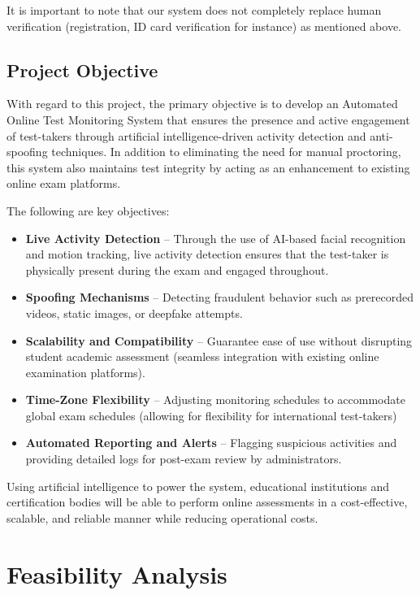 \documentclass[12pt,a4paper]{article}
\begin{document}
It is important to note that our system does not completely replace human verification (registration, ID card verification for instance) as mentioned above.

\subsection{Project Objective}

With regard to this project, the primary objective is to develop an Automated Online Test Monitoring System that ensures the presence and active engagement of test-takers through artificial intelligence-driven activity detection and anti-spoofing techniques. In addition to eliminating the need for manual proctoring, this system also maintains test integrity by acting as an enhancement to existing online exam platforms.

The following are key objectives:

\begin{itemize}
    \item \textbf{Live Activity Detection} – Through the use of AI-based facial recognition and motion tracking, live activity detection ensures that the test-taker is physically present during the exam and engaged throughout.
    \item \textbf{Spoofing Mechanisms} – Detecting fraudulent behavior such as prerecorded videos, static images, or deepfake attempts.
    \item \textbf{Scalability and Compatibility} – Guarantee ease of use without disrupting student academic assessment (seamless integration with existing online examination platforms).
    \item \textbf{Time-Zone Flexibility} – Adjusting monitoring schedules to accommodate global exam schedules (allowing for flexibility for international test-takers)
    \item \textbf{Automated Reporting and Alerts} – Flagging suspicious activities and providing detailed logs for post-exam review by administrators.
\end{itemize}

Using artificial intelligence to power the system, educational institutions and certification bodies will be able to perform online assessments in a cost-effective, scalable, and reliable manner while reducing operational costs.

\section{Feasibility Analysis}
\end{document}

